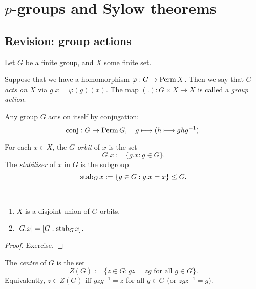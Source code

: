 \chapter{$p$-groups and Sylow theorems}

\section{Revision: group actions}

Let $G$ be a finite group, and $X$ some finite set.

\begin{definition}
    Suppose that we have a homomorphism $\varphi: G \to \operatorname{Perm}{X}$. Then we say that $G$ \emph{acts on} $X$ via $g . x = \varphi(g)(x)$. The map $(.) : G \times X \to X$ is called a \emph{group action}.
\end{definition}

\begin{example}
    Any group $G$ acts on itself by conjugation:
    \[
        \operatorname{conj}: G \to \operatorname{Perm}{G}, \quad g \longmapsto (h \longmapsto ghg^{-1}).
    \]
\end{example}

\begin{definition}
    For each $x \in X$, the $G$-\emph{orbit} of $x$ is the set
    \[
        G . x := \{g.x : g \in G\}.
    \]
    The \emph{stabiliser} of $x$ in $G$ is the subgroup
    \[
        \operatorname{stab}_{{G}}{{x}} := \{g \in G: g . x = x\} \leq G.
    \]
\end{definition}

\begin{proposition}~
    \begin{enumerate}[label=(\alph*)]
        \item $X$ is a disjoint union of $G$-orbits.
        \item $|G . x| = [G : \operatorname{stab}_{{G}}{{x}}]$.
    \end{enumerate}
\end{proposition}

\begin{proof}
    Exercise.
\end{proof}

\begin{definition}
    The \emph{centre} of $G$ is the set
    \[
        Z(G) := \{z \in G: gz = zg \text{ for all } g \in G\}.
    \]
    Equivalently, $z \in Z(G)$ iff $gzg^{-1} = z$ for all $g \in G$ (or $zgz^{-1} = g$).
\end{definition}

